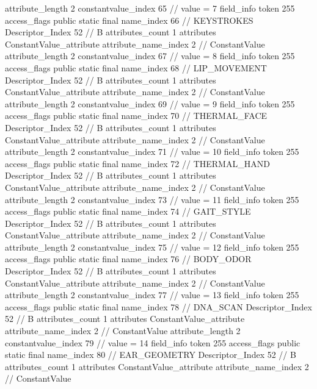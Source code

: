 {{{{{{{					attribute_length	2
					constantvalue_index	65		// value = 7
				}
				}
			}
			field_info {
				token	255
				access_flags	public static final
				name_index	66		// KEYSTROKES
				Descriptor_Index	52		// B
				attributes_count	1
				attributes {
				ConstantValue_attribute {
					attribute_name_index	2		// ConstantValue
					attribute_length	2
					constantvalue_index	67		// value = 8
				}
				}
			}
			field_info {
				token	255
				access_flags	public static final
				name_index	68		// LIP_MOVEMENT
				Descriptor_Index	52		// B
				attributes_count	1
				attributes {
				ConstantValue_attribute {
					attribute_name_index	2		// ConstantValue
					attribute_length	2
					constantvalue_index	69		// value = 9
				}
				}
			}
			field_info {
				token	255
				access_flags	public static final
				name_index	70		// THERMAL_FACE
				Descriptor_Index	52		// B
				attributes_count	1
				attributes {
				ConstantValue_attribute {
					attribute_name_index	2		// ConstantValue
					attribute_length	2
					constantvalue_index	71		// value = 10
				}
				}
			}
			field_info {
				token	255
				access_flags	public static final
				name_index	72		// THERMAL_HAND
				Descriptor_Index	52		// B
				attributes_count	1
				attributes {
				ConstantValue_attribute {
					attribute_name_index	2		// ConstantValue
					attribute_length	2
					constantvalue_index	73		// value = 11
				}
				}
			}
			field_info {
				token	255
				access_flags	public static final
				name_index	74		// GAIT_STYLE
				Descriptor_Index	52		// B
				attributes_count	1
				attributes {
				ConstantValue_attribute {
					attribute_name_index	2		// ConstantValue
					attribute_length	2
					constantvalue_index	75		// value = 12
				}
				}
			}
			field_info {
				token	255
				access_flags	public static final
				name_index	76		// BODY_ODOR
				Descriptor_Index	52		// B
				attributes_count	1
				attributes {
				ConstantValue_attribute {
					attribute_name_index	2		// ConstantValue
					attribute_length	2
					constantvalue_index	77		// value = 13
				}
				}
			}
			field_info {
				token	255
				access_flags	public static final
				name_index	78		// DNA_SCAN
				Descriptor_Index	52		// B
				attributes_count	1
				attributes {
				ConstantValue_attribute {
					attribute_name_index	2		// ConstantValue
					attribute_length	2
					constantvalue_index	79		// value = 14
				}
				}
			}
			field_info {
				token	255
				access_flags	public static final
				name_index	80		// EAR_GEOMETRY
				Descriptor_Index	52		// B
				attributes_count	1
				attributes {
				ConstantValue_attribute {
					attribute_name_index	2		// ConstantValue
}}}}}}}
